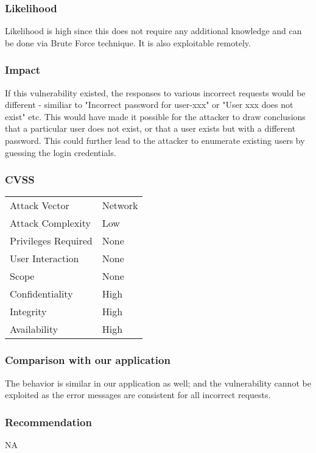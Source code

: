 \subsubsection{Likelihood}
Likelihood is high since this does not require any additional knowledge and can be done via Brute Force technique.
It is also exploitable remotely.

\subsubsection{Impact}
If this vulnerability existed, the responses to various incorrect requests would be different - similiar to "Incorrect password for user-xxx" or "User xxx does not exist" etc. This would have made it possible for the attacker to draw conclusions that a particular user does not exist, or that a user exists but with a different password. This could further lead to the attacker to enumerate existing users by guessing the login credentials.

\subsubsection{CVSS}
\begin{tabular}{l | l}
Attack Vector		& Network \\
Attack Complexity	& Low \\
Privileges Required & None \\
User Interaction	& None \\
Scope				& None \\
Confidentiality		& High \\
Integrity			& High \\
Availability		& High
\end{tabular}

\subsubsection{Comparison with our application}
The behavior is similar in our application as well; and the vulnerability cannot be exploited as the error messages are consistent for all incorrect requests.

\subsubsection{Recommendation}
NA

\clearpage